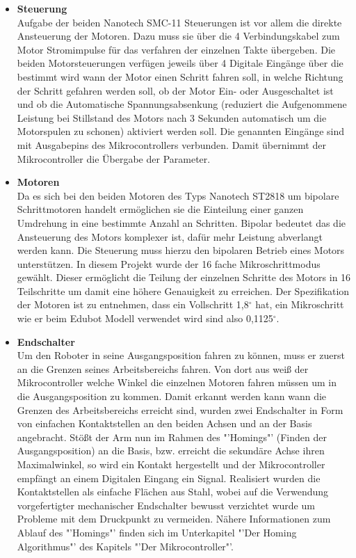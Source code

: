 \begin{itemize}
\item \textbf{Steuerung}\\
Aufgabe der beiden Nanotech SMC-11 Steuerungen ist vor allem die direkte Ansteuerung der Motoren. Dazu muss sie über die 4 Verbindungskabel zum Motor Stromimpulse für das verfahren der einzelnen Takte übergeben.
Die beiden Motorsteuerungen verfügen jeweils über 4 Digitale Eingänge über die bestimmt wird wann der Motor einen Schritt fahren soll, in welche Richtung der Schritt gefahren werden soll, ob der Motor Ein- oder Ausgeschaltet ist und ob die Automatische Spannungsabsenkung (reduziert die Aufgenommene Leistung bei Stillstand des Motors nach 3 Sekunden automatisch um die Motorspulen zu schonen) aktiviert werden soll.
Die genannten Eingänge sind mit Ausgabepins des Mikrocontrollers verbunden. Damit übernimmt der Mikrocontroller die Übergabe der Parameter.

\item \textbf{Motoren}\\
Da es sich bei den beiden Motoren des Typs Nanotech ST2818 um bipolare Schrittmotoren handelt ermöglichen sie die Einteilung einer ganzen Umdrehung in eine bestimmte Anzahl an Schritten. Bipolar bedeutet das die Ansteuerung des Motors komplexer ist, dafür mehr Leistung abverlangt werden kann. Die Steuerung muss hierzu den bipolaren Betrieb eines Motors unterstützen.
In diesem Projekt wurde der 16 fache Mikroschrittmodus gewählt. Dieser ermöglicht die Teilung der einzelnen Schritte des Motors in 16 Teilschritte um damit eine höhere Genauigkeit zu erreichen. Der Spezifikation der Motoren ist zu entnehmen, dass ein Vollschritt 1,8$^\circ$ hat, ein Mikroschritt wie er beim Edubot Modell verwendet wird sind also 0,1125$^\circ$. 

\item \textbf{Endschalter}\\
Um den Roboter in seine Ausgangsposition fahren zu können, muss er zuerst an die Grenzen seines Arbeitsbereichs fahren. Von dort aus weiß der Mikrocontroller welche Winkel die einzelnen Motoren fahren müssen um in die Ausgangsposition zu kommen.
Damit erkannt werden kann wann die Grenzen des Arbeitsbereichs erreicht sind, wurden zwei Endschalter in Form von einfachen Kontaktstellen an den beiden Achsen und an der Basis angebracht. Stößt der Arm nun im Rahmen des "'Homings"' (Finden der Ausgangsposition) an die Basis, bzw. erreicht die sekundäre Achse ihren Maximalwinkel, so wird ein Kontakt hergestellt und der Mikrocontroller empfängt an einem Digitalen Eingang ein Signal. Realisiert wurden die Kontaktstellen als einfache Flächen aus Stahl, wobei auf die Verwendung vorgefertigter mechanischer Endschalter bewusst verzichtet wurde um Probleme mit dem Druckpunkt zu vermeiden. Nähere Informationen zum Ablauf des "'Homings"' finden sich im Unterkapitel "'Der Homing Algorithmus"' des Kapitels "'Der Mikrocontroller"'.
\end{itemize}


